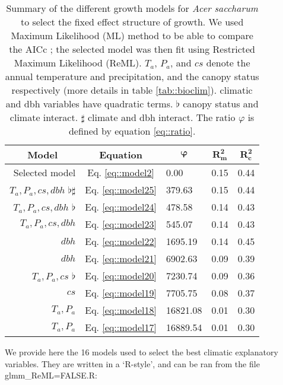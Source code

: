 \begin{refsection}
\begin{table}
	\centering
	\caption{Summary of the different growth models for \textit{Acer saccharum} to select the fixed effect structure of growth. We used Maximum Likelihood (ML) method to be able to compare the AICc \citep{AICcmodavg}; the selected model was then fit using Restricted Maximum Likelihood (ReML). $ T_a $, $ P_a $, and $ cs $ denote the annual temperature and precipitation, and the canopy status respectively (more details in table \ref{tab::bioclim}). \dag climatic and dbh variables have quadratic terms. $ \flat $ canopy status and climate interact. $ \sharp $ climate and dbh interact. The ratio $ \varphi $ is defined by equation \eqref{eq::ratio}. \label{tab::acsa_fixeff}}
	\begin{tabular}{@{}rclll@{}}
	\toprule
	\multicolumn{1}{c}{\textbf{Model}} & \multicolumn{1}{c}{\textbf{Equation}} & \multicolumn{1}{c}{$ \bm{\varphi} $} & \multicolumn{1}{c}{$ \bm{R^2_m} $} & \multicolumn{1}{c}{$ \bm{R^2_c} $} \\
	\midrule
		Selected model & Eq. \ref{eq::model2} & 0.00 & 0.15 & 0.44 \\
		$ T_a, P_a, cs, dbh $ \dag $ \flat \sharp $ & Eq. \ref{eq::model25} & 379.63 & 0.15 & 0.44 \\
		$ T_a, P_a, cs, dbh $ \dag $ \flat $ & Eq. \ref{eq::model24} & 478.58 & 0.14 & 0.43 \\
		$ T_a, P_a, cs, dbh $ \dag & Eq. \ref{eq::model23} & 545.07 & 0.14 & 0.43 \\
		$ dbh $ \dag & Eq. \ref{eq::model22} & 1695.19 & 0.14 & 0.45 \\
		$ dbh $ & Eq. \ref{eq::model21} & 6902.63 & 0.09 & 0.39 \\
		$ T_a, P_a, cs $ \dag $ \flat $ & Eq. \ref{eq::model20} & 7230.74 & 0.09 & 0.36 \\
		$ cs $ & Eq. \ref{eq::model19} & 7705.75 & 0.08 & 0.37 \\
		$ T_a, P_a $ \dag & Eq. \ref{eq::model18} & 16821.08 & 0.01 & 0.30 \\
		$ T_a, P_a $ & Eq. \ref{eq::model17} & 16889.54 & 0.01 & 0.30 \\
   \bottomrule
	\end{tabular}
\end{table}

We provide here the 16 models used to select the best climatic explanatory variables. They are written in a `R-style', and can be ran from the file glmm\_ReML=FALSE.R:


\end{refsection}
